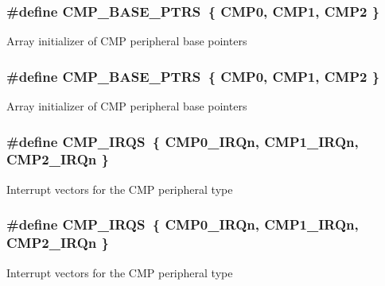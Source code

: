 \subsubsection[{\texorpdfstring{C\+M\+P\+\_\+\+B\+A\+S\+E\+\_\+\+P\+T\+RS}{CMP_BASE_PTRS}}]{\setlength{\rightskip}{0pt plus 5cm}\#define C\+M\+P\+\_\+\+B\+A\+S\+E\+\_\+\+P\+T\+RS~\{ {\bf C\+M\+P0}, {\bf C\+M\+P1}, {\bf C\+M\+P2} \}}\hypertarget{group__CMP__Peripheral__Access__Layer_gacc69654296499d45b2060956a3c8e97f}{}\label{group__CMP__Peripheral__Access__Layer_gacc69654296499d45b2060956a3c8e97f}
Array initializer of C\+MP peripheral base pointers 
\subsubsection[{\texorpdfstring{C\+M\+P\+\_\+\+B\+A\+S\+E\+\_\+\+P\+T\+RS}{CMP_BASE_PTRS}}]{\setlength{\rightskip}{0pt plus 5cm}\#define C\+M\+P\+\_\+\+B\+A\+S\+E\+\_\+\+P\+T\+RS~\{ {\bf C\+M\+P0}, {\bf C\+M\+P1}, {\bf C\+M\+P2} \}}\hypertarget{group__CMP__Peripheral__Access__Layer_gacc69654296499d45b2060956a3c8e97f}{}\label{group__CMP__Peripheral__Access__Layer_gacc69654296499d45b2060956a3c8e97f}
Array initializer of C\+MP peripheral base pointers 
\subsubsection[{\texorpdfstring{C\+M\+P\+\_\+\+I\+R\+QS}{CMP_IRQS}}]{\setlength{\rightskip}{0pt plus 5cm}\#define C\+M\+P\+\_\+\+I\+R\+QS~\{ {\bf C\+M\+P0\+\_\+\+I\+R\+Qn}, {\bf C\+M\+P1\+\_\+\+I\+R\+Qn}, {\bf C\+M\+P2\+\_\+\+I\+R\+Qn} \}}\hypertarget{group__CMP__Peripheral__Access__Layer_ga2497116c7859b3f4e8fe3e1b21a84cd9}{}\label{group__CMP__Peripheral__Access__Layer_ga2497116c7859b3f4e8fe3e1b21a84cd9}
Interrupt vectors for the C\+MP peripheral type 
\subsubsection[{\texorpdfstring{C\+M\+P\+\_\+\+I\+R\+QS}{CMP_IRQS}}]{\setlength{\rightskip}{0pt plus 5cm}\#define C\+M\+P\+\_\+\+I\+R\+QS~\{ {\bf C\+M\+P0\+\_\+\+I\+R\+Qn}, {\bf C\+M\+P1\+\_\+\+I\+R\+Qn}, {\bf C\+M\+P2\+\_\+\+I\+R\+Qn} \}}\hypertarget{group__CMP__Peripheral__Access__Layer_ga2497116c7859b3f4e8fe3e1b21a84cd9}{}\label{group__CMP__Peripheral__Access__Layer_ga2497116c7859b3f4e8fe3e1b21a84cd9}
Interrupt vectors for the C\+MP peripheral type 